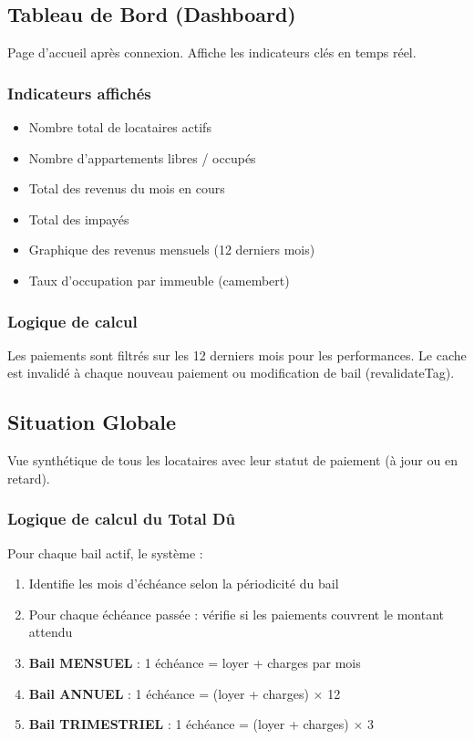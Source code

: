 \documentclass[a4paper,11pt]{article}
\begin{document}
\subsection{Tableau de Bord (Dashboard)}

Page d'accueil après connexion. Affiche les indicateurs clés en temps réel.

\subsubsection{Indicateurs affichés}
\begin{itemize}
  \item Nombre total de locataires actifs
  \item Nombre d'appartements libres / occupés
  \item Total des revenus du mois en cours
  \item Total des impayés
  \item Graphique des revenus mensuels (12 derniers mois)
  \item Taux d'occupation par immeuble (camembert)
\end{itemize}

\subsubsection{Logique de calcul}
Les paiements sont filtrés sur les 12 derniers mois pour les performances. Le cache est invalidé à chaque nouveau paiement ou modification de bail (revalidateTag).

\subsection{Situation Globale}

Vue synthétique de tous les locataires avec leur statut de paiement (à jour ou en retard).

\subsubsection{Logique de calcul du Total Dû}
Pour chaque bail actif, le système :
\begin{enumerate}
  \item Identifie les mois d'échéance selon la périodicité du bail
  \item Pour chaque échéance passée : vérifie si les paiements couvrent le montant attendu
  \item \textbf{Bail MENSUEL} : 1 échéance = loyer + charges par mois
  \item \textbf{Bail ANNUEL} : 1 échéance = (loyer + charges) $\times$ 12
  \item \textbf{Bail TRIMESTRIEL} : 1 échéance = (loyer + charges) $\times$ 3
\end{enumerate}
\end{document}
